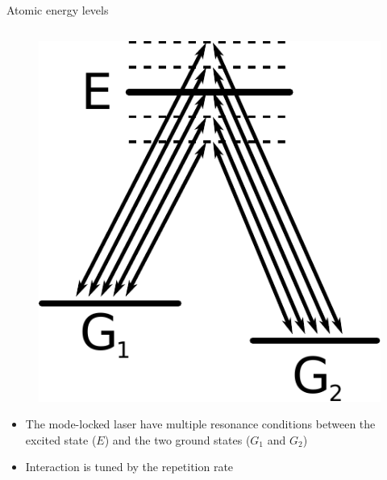 \begin{block}{Atomic energy levels}
\begin{columns}
\begin{column}{0.49\textwidth}
\begin{figure}
        \begin{center}
          \includegraphics[width=.6\textwidth]{figures/modelockresonance}
        \end{center}
      \end{figure}
      \begin{itemize}
      \item The mode-locked laser have multiple resonance conditions between the excited state ($E$) and the two ground states ($G_1$ and $G_2$)
      \item Interaction is tuned by the repetition rate 
      \end{itemize}
    \end{column}
  \end{columns}
\end{block}
